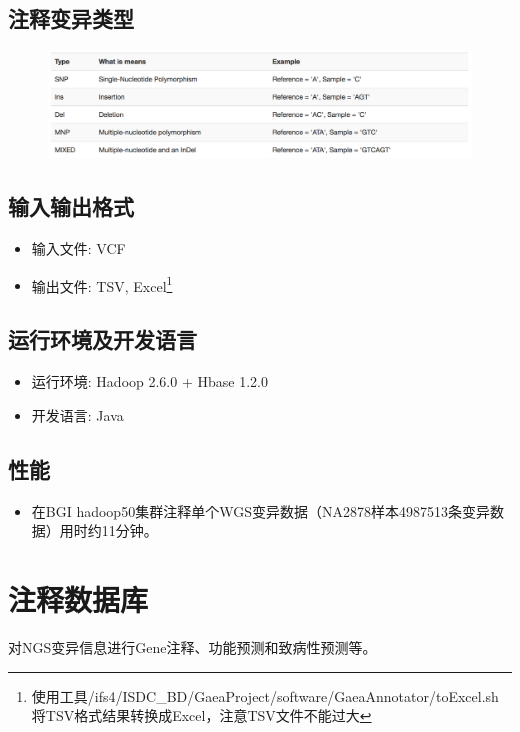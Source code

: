 \documentclass[UTF8,10pt,a4paper]{ctexart}
\begin{document}
\subsection{注释变异类型}
\begin{figure}[htbp]
\begin{center}
\label{variantType}
\includegraphics[width=15cm]{variantType.png}
\end{center}
\end{figure}

\subsection{输入输出格式}
\begin{itemize}
\item 输入文件: VCF 
\item 输出文件: TSV, Excel\footnote{使用工具/ifs4/ISDC\_BD/GaeaProject/software/GaeaAnnotator/toExcel.sh将TSV格式结果转换成Excel，注意TSV文件不能过大}
\end{itemize}

\subsection{运行环境及开发语言}
\begin{itemize}
\item 运行环境: Hadoop 2.6.0 + Hbase 1.2.0
\item 开发语言: Java
\end{itemize}

\subsection{性能}
\begin{itemize}
\item 在BGI hadoop50集群注释单个WGS变异数据（NA2878样本4987513条变异数据）用时约11分钟。
\end{itemize}

\section{注释数据库}
对NGS变异信息进行Gene注释、功能预测和致病性预测等。
\end{document}
